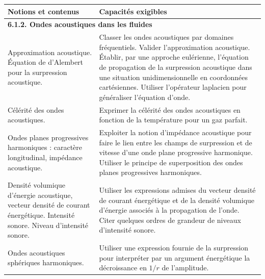 {\scriptsize
        \begin{tabularx}{\textwidth}{|p{}|X|}
            \hline 
            \textbf{Notions et contenus} & \textbf{Capacités exigibles} \\
            \hline 
            \multicolumn{2}{|l|}{\textbf{6.1.2. Ondes acoustiques dans les fluides }} \\
            \hline
            Approximation acoustique. Équation de d'Alembert pour la surpression acoustique.  & 
            Classer les ondes acoustiques par domaines fréquentiels.
Valider l'approximation acoustique. Établir, par une approche eulérienne, l'équation de propagation de la surpression acoustique dans une situation unidimensionnelle en coordonnées cartésiennes.
Utiliser l'opérateur laplacien pour généraliser l'équation d'onde. \\
            \hline 
             Célérité des ondes acoustiques.   & 
            Exprimer la célérité des ondes acoustiques en fonction de la température pour un gaz parfait. \\
        \hline 
        Ondes planes progressives harmoniques : caractère longitudinal, impédance acoustique. & 
        Exploiter la notion d'impédance acoustique pour faire le lien entre les champs de surpression et de vitesse d'une onde plane progressive harmonique.
Utiliser le principe de superposition des ondes planes progressives harmoniques. \\ 
        \hline
        Densité volumique d'énergie acoustique, vecteur densité de courant énergétique. Intensité sonore. Niveau d'intensité sonore.  & 
        Utiliser les expressions admises du vecteur densité de courant énergétique et de la densité volumique d'énergie associés à la propagation de l'onde.
        Citer quelques ordres de grandeur de niveaux d'intensité sonore. \\
        \hline 
        Ondes acoustiques sphériques harmoniques.   & 
        Utiliser une expression fournie de la surpression pour interpréter par un argument énergétique la décroissance en $1 / r$ de l'amplitude. \\
        \hline
        \end{tabularx}
\vspace{0.5cm}
}
